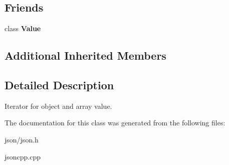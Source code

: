 \subsection*{Friends}
\begin{DoxyCompactItemize}
\item 
\mbox{\label{classJson_1_1ValueIterator_aeceedf6e1a7d48a588516ce2b1983d6f}} 
class {\bfseries Value}
\end{DoxyCompactItemize}
\subsection*{Additional Inherited Members}


\subsection{Detailed Description}
Iterator for object and array value. 

The documentation for this class was generated from the following files\+:\begin{DoxyCompactItemize}
\item 
json/json.\+h\item 
jsoncpp.\+cpp\end{DoxyCompactItemize}

